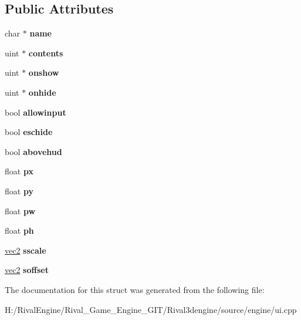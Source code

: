 \subsection*{Public Attributes}
\begin{DoxyCompactItemize}
\item 
\mbox{\label{struct_u_i_1_1_window_a3cd92c5993eeccceba7b8fcbb28f80a2}} 
char $\ast$ {\bfseries name}
\item 
\mbox{\label{struct_u_i_1_1_window_aa13fc44ce414093e2f7021ed681fa38b}} 
uint $\ast$ {\bfseries contents}
\item 
\mbox{\label{struct_u_i_1_1_window_a9ac38e3654fd284bbaf761befd5cbafa}} 
uint $\ast$ {\bfseries onshow}
\item 
\mbox{\label{struct_u_i_1_1_window_a5d38c24c334abf29bfd19a07acb8cf28}} 
uint $\ast$ {\bfseries onhide}
\item 
\mbox{\label{struct_u_i_1_1_window_a8eb9316327af37911d58bfa23e20d4f3}} 
bool {\bfseries allowinput}
\item 
\mbox{\label{struct_u_i_1_1_window_a702e8c811604d373e25dfafe14818617}} 
bool {\bfseries eschide}
\item 
\mbox{\label{struct_u_i_1_1_window_a77e73ac0976884dbad6c6a4fe880378c}} 
bool {\bfseries abovehud}
\item 
\mbox{\label{struct_u_i_1_1_window_a09d9b8700bf03c5cca2b25da3dcfe3cf}} 
float {\bfseries px}
\item 
\mbox{\label{struct_u_i_1_1_window_a829c23e3857681edb189fdb7949fd9ed}} 
float {\bfseries py}
\item 
\mbox{\label{struct_u_i_1_1_window_a9f7d4f3eab25d9e8052f8ab2745856c0}} 
float {\bfseries pw}
\item 
\mbox{\label{struct_u_i_1_1_window_a1247b081b9c758de3e21baf642a741c8}} 
float {\bfseries ph}
\item 
\mbox{\label{struct_u_i_1_1_window_aa4b45ddbcadceb11de5c0f64f7c9753d}} 
\hyperlink{structvec2}{vec2} {\bfseries sscale}
\item 
\mbox{\label{struct_u_i_1_1_window_aae803b77a871ca1a4d8c73e8ef751127}} 
\hyperlink{structvec2}{vec2} {\bfseries soffset}
\end{DoxyCompactItemize}


The documentation for this struct was generated from the following file\+:\begin{DoxyCompactItemize}
\item 
H\+:/\+Rival\+Engine/\+Rival\+\_\+\+Game\+\_\+\+Engine\+\_\+\+G\+I\+T/\+Rival3dengine/source/engine/ui.\+cpp\end{DoxyCompactItemize}
